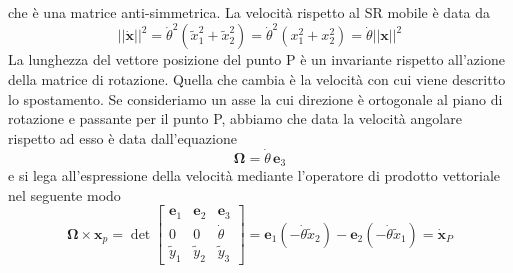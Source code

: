 che \`{e} una matrice anti-simmetrica. La velocit\`{a} rispetto al SR mobile \`{e} data da 
\begin{equation}
	||\bm{\dot{x}}||^2 = \dot{\theta}^2 \left (\tilde{x}_1^2 + \tilde{x}_2^2 \right) =  \dot{\theta}^2 \left (x_1^2 + x_2^2 \right) = \dot{\theta} ||\bm{x}||^2 
\end{equation}
La lunghezza del vettore posizione del punto P \`{e} un invariante rispetto all'azione della matrice di rotazione. Quella che cambia \`{e} la velocit\`{a} con cui viene descritto lo spostamento.
\newline 
Se consideriamo un asse la cui direzione \`{e} ortogonale al piano di rotazione e passante per il punto P, abbiamo che data la velocit\`{a} angolare rispetto ad esso \`{e} data dall'equazione
\begin{equation}
	\bm{\Omega} = \dot{\theta}\,\bm{e}_3
\end{equation}
e si lega all'espressione della velocit\`{a} mediante l'operatore di prodotto vettoriale nel seguente modo
\begin{equation}
\bm{\Omega} \times \bm{x}_p=\operatorname{det}\left[\begin{array}{ccc}
\bm{e}_1 & \bm{e}_2 & \bm{e}_3 \\
0 & 0 & \dot{\theta} \\
\tilde{y}_1 & \tilde{y}_2 & \tilde{y}_3
\end{array}\right]= \bm{e}_1 (-\dot{\theta}\tilde{x}_2) - \bm{e}_{2} (-\dot{\theta}\tilde{x}_1) = \bm{\dot{x}}_{P}
\end{equation}
